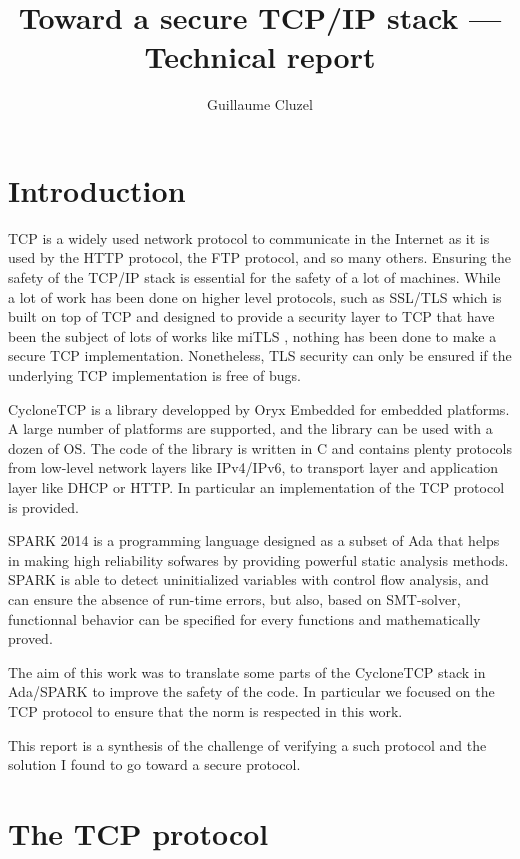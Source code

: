 \documentclass[a4paper, 10pt]{article}
\author{Guillaume Cluzel}
\title{Toward a secure TCP/IP stack --- Technical report}
\begin{document}
    \maketitle

    \section{Introduction}

    TCP is a widely used network protocol to communicate in the Internet as
    it is used by the HTTP protocol, the FTP protocol, and so many others.
    Ensuring the safety of the TCP/IP stack is essential for the safety of
    a lot of machines. While a lot of work has been done on higher level
    protocols, such as SSL/TLS which is built on top of TCP and designed
    to provide a security layer to TCP that have been the subject of lots of
    works like miTLS \cite{}, nothing has been done to make a secure TCP
    implementation. Nonetheless, TLS security can only be ensured if the underlying
    TCP implementation is free of bugs.

    CycloneTCP is a library developped by Oryx Embedded for embedded platforms.
    A large number of platforms are supported, and the library can be used
    with a dozen of OS. The code of the library is written in C and contains
    plenty protocols from low-level network layers like IPv4/IPv6, to transport layer
    and application layer like DHCP or HTTP. In particular an implementation of
    the TCP protocol is provided.

    SPARK 2014 is a programming language designed as a subset of Ada that helps in
    making high reliability sofwares by providing powerful static analysis methods.
    SPARK is able to detect uninitialized variables with control flow analysis,
    and can ensure the absence of run-time errors,
    but also, based on SMT-solver, functionnal behavior can be specified for every
    functions and mathematically proved.

    The aim of this work was to translate some parts of the CycloneTCP stack
    in Ada/SPARK to improve the safety of the code. In particular we focused
    on the TCP protocol to ensure that the norm is respected in this work.

    This report is a synthesis of the challenge of verifying a such protocol
    and the solution I found to go toward a secure protocol.


    \section{The TCP protocol}
\end{document}
